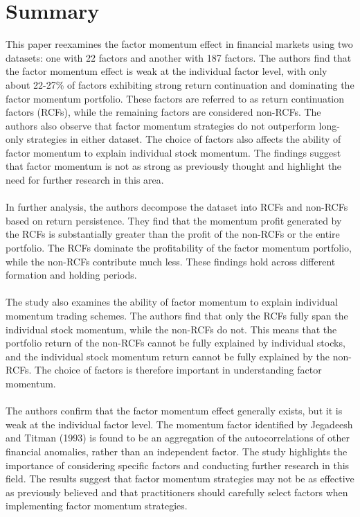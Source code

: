 \documentclass{article}
\begin{document}
\section{Summary}
This paper reexamines the factor momentum effect in financial markets using two datasets: one with 22 factors and another with 187 factors. The authors find that the factor momentum effect is weak at the individual factor level, with only about 22-27\% of factors exhibiting strong return continuation and dominating the factor momentum portfolio. These factors are referred to as return continuation factors (RCFs), while the remaining factors are considered non-RCFs. The authors also observe that factor momentum strategies do not outperform long-only strategies in either dataset. The choice of factors also affects the ability of factor momentum to explain individual stock momentum. The findings suggest that factor momentum is not as strong as previously thought and highlight the need for further research in this area. \\
\\
In further analysis, the authors decompose the dataset into RCFs and non-RCFs based on return persistence. They find that the momentum profit generated by the RCFs is substantially greater than the profit of the non-RCFs or the entire portfolio. The RCFs dominate the profitability of the factor momentum portfolio, while the non-RCFs contribute much less. These findings hold across different formation and holding periods. \\
\\
The study also examines the ability of factor momentum to explain individual momentum trading schemes. The authors find that only the RCFs fully span the individual stock momentum, while the non-RCFs do not. This means that the portfolio return of the non-RCFs cannot be fully explained by individual stocks, and the individual stock momentum return cannot be fully explained by the non-RCFs. The choice of factors is therefore important in understanding factor momentum. \\
\\
The authors confirm that the factor momentum effect generally exists, but it is weak at the individual factor level. The momentum factor identified by Jegadeesh and Titman (1993) is found to be an aggregation of the autocorrelations of other financial anomalies, rather than an independent factor. The study highlights the importance of considering specific factors and conducting further research in this field. The results suggest that factor momentum strategies may not be as effective as previously believed and that practitioners should carefully select factors when implementing factor momentum strategies. \\
\end{document}
